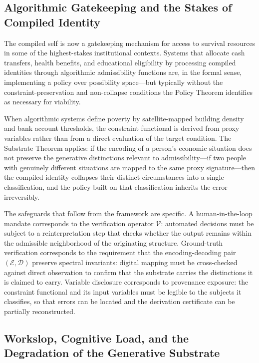 \documentclass[12pt, a4paper]{article}
\theoremstyle{plain}
\theoremstyle{definition}
\theoremstyle{remark}
\begin{document}
\subsection{Algorithmic Gatekeeping and the Stakes of Compiled Identity}

The compiled self is now a gatekeeping mechanism for access to survival resources in some of the highest-stakes institutional contexts. Systems that allocate cash transfers, health benefits, and educational eligibility by processing compiled identities through algorithmic admissibility functions are, in the formal sense, implementing a policy over possibility space---but typically without the constraint-preservation and non-collapse conditions the Policy Theorem identifies as necessary for viability.

When algorithmic systems define poverty by satellite-mapped building density and bank account thresholds, the constraint functional is derived from proxy variables rather than from a direct evaluation of the target condition. The Substrate Theorem applies: if the encoding of a person's economic situation does not preserve the generative distinctions relevant to admissibility---if two people with genuinely different situations are mapped to the same proxy signature---then the compiled identity collapses their distinct circumstances into a single classification, and the policy built on that classification inherits the error irreversibly.

The safeguards that follow from the framework are specific. A human-in-the-loop mandate corresponds to the verification operator $\mathcal{V}$: automated decisions must be subject to a reinterpretation step that checks whether the output remains within the admissible neighborhood of the originating structure. Ground-truth verification corresponds to the requirement that the encoding-decoding pair $(\mathcal{E}, \mathcal{D})$ preserve spectral invariants: digital mapping must be cross-checked against direct observation to confirm that the substrate carries the distinctions it is claimed to carry. Variable disclosure corresponds to provenance exposure: the constraint functional and its input variables must be legible to the subjects it classifies, so that errors can be located and the derivation certificate can be partially reconstructed.

\subsection{Workslop, Cognitive Load, and the Degradation of the Generative Substrate}
\end{document}
